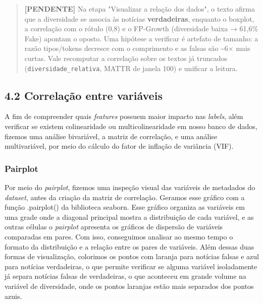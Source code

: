 \documentclass[
  brazilian,
  11pt,
]{article}
\begin{document}
\begin{quote}
\textbf{{[}PENDENTE{]}} Na etapa "Visualizar a relação dos dados", o texto afirma que a diversidade se associa às notícias \textbf{verdadeiras}, enquanto o boxplot, a correlação com o rótulo (0,8) e o FP-Growth (diversidade baixa → 61,6\% Fake) apontam o oposto. Uma hipótese a verificar é artefato de tamanho: a razão tipos/tokens decresce com o comprimento e as falsas são \textasciitilde6× mais curtas. Vale recomputar a correlação sobre os textos já truncados (\texttt{diversidade\_relativa}, MATTR de janela 100) e unificar a leitura.
\end{quote}

\subsection{4.2 Correlação entre variáveis}\label{correlauxe7uxe3o-entre-variuxe1veis}

A fim de compreender quais \emph{features} possuem maior impacto nas \emph{labels}, além verificar se existem colinearidade ou multicolinearidade em nosso banco de dados, fizemos uma análise bivariável, a matriz de correlação, e uma análise multivariável, por meio do cálculo do fator de inflação de variância (VIF).

\subsubsection{Pairplot}\label{pairplot}

Por meio do \emph{pairplot}, fizemos uma inspeção visual das variáveis de metadados do \emph{dataset}, antes da criação da matriz de correlação. Geramos esse gráfico com a função .pairplot() da biblioteca seaborn. Esse gráfico organiza as variáveis em uma grade onde a diagonal principal mostra a distribuição de cada variável, e as outras células o \emph{pairplot} apresenta os gráficos de dispersão de variáveis comparadas em pares. Com isso, conseguimos analisar ao mesmo tempo o formato da distribuição e a relação entre os pares de variáveis. Além dessas duas formas de visualização, colorimos os pontos com laranja para notícias falsas e azul para notícias verdadeiras, o que permite verificar se alguma variável isoladamente já separa notícias falsas de verdadeiras, o que aconteceu em grande volume na variável de diversidade, onde os pontos laranjas estão mais separados dos pontos azuis.
\end{document}
